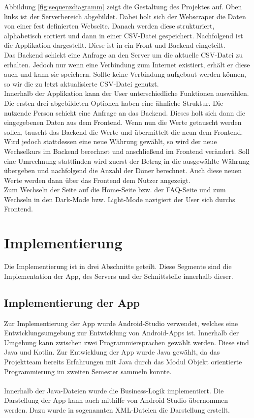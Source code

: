 \documentclass[conference]{IEEEtran}
\begin{document}
\noindent
Abbildung \ref{fig:sequenzdiagramm} zeigt die Gestaltung des Projektes auf. Oben links ist der Serverbereich abgebildet. Dabei holt sich der Webscraper die Daten von einer fest definierten Webseite. Danach werden diese strukturiert, alphabetisch sortiert und dann in einer CSV-Datei gespeichert. Nachfolgend ist die Applikation dargestellt. Diese ist in ein Front und Backend eingeteilt. \\
Das Backend schickt eine Anfrage an den Server um die aktuelle CSV-Datei zu erhalten. Jedoch nur wenn eine Verbindung zum Internet existiert, erhält er diese auch und kann sie speichern. Sollte keine Verbindung aufgebaut werden können, so wir die zu letzt aktualisierte CSV-Datei genutzt. \\
Innerhalb der Applikation kann der User unterschiedliche Funktionen auswählen. Die ersten drei abgebildeten Optionen haben eine ähnliche Struktur. Die nutzende Person schickt eine Anfrage an das Backend. Dieses holt sich dann die eingegebenen Daten aus dem Frontend. Wenn nun die Werte getauscht werden sollen, tauscht das Backend die Werte und übermittelt die neun dem Frontend. Wird jedoch stattdessen eine neue Währung gewählt, so wird der neue Wechselkurs im Backend berechnet und anschließend im Frontend verändert. Soll eine Umrechnung stattfinden wird zuerst der Betrag in die ausgewählte Währung übergeben und nachfolgend die Anzahl der Döner berechnet. Auch diese neuen Werte werden dann über das Frontend dem Nutzer angezeigt. \\ 
Zum Wechseln der Seite auf die Home-Seite bzw. der FAQ-Seite und zum Wechseln in den Dark-Mode bzw. Light-Mode navigiert der User sich durchs Frontend.

\section{Implementierung}
Die Implementierung ist in drei Abschnitte geteilt. Diese Segmente sind die Implementation der App, des Servers und der Schnittstelle innerhalb dieser.

\subsection{Implementierung der App}
Zur Implementierung der App wurde Android-Studio verwendet, welches eine Entwicklungsumgebung zur Entwicklung von Android-Apps ist. Innerhalb der Umgebung kann zwischen zwei Programmiersprachen gewählt werden. Diese sind Java und Kotlin. Zur Entwicklung der App wurde Java gewählt, da das Projektteam bereits Erfahrungen mit Java  durch das Modul Objekt orientierte Programmierung im zweiten Semester sammeln konnte. \\\\ Innerhalb der Java-Dateien wurde die Business-Logik implementiert. Die Darstellung der App kann auch mithilfe von Android-Studio übernommen werden. Dazu wurde in sogenannten XML-Dateien die Darstellung erstellt.
\end{document}
